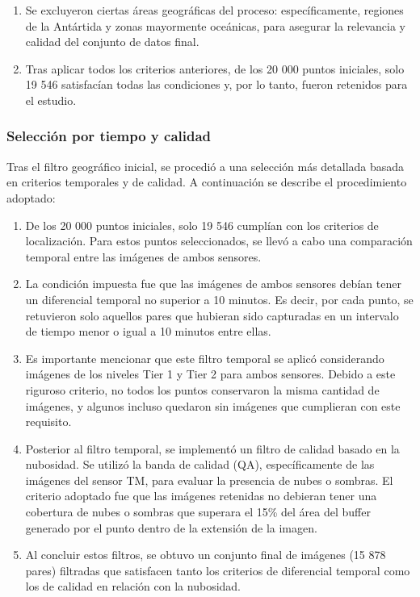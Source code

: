 \begin{enumerate}
                    \item Se excluyeron ciertas áreas geográficas del proceso: específicamente, regiones de la Antártida y zonas mayormente oceánicas, para asegurar la relevancia y calidad del conjunto de datos final.
                    
                    \item Tras aplicar todos los criterios anteriores, de los 20 000 puntos iniciales, solo 19 546 satisfacían todas las condiciones y, por lo tanto, fueron retenidos para el estudio.
                \end{enumerate}
            \subsubsection{Selección por tiempo y calidad}
                Tras el filtro geográfico inicial, se procedió a una selección más detallada basada en criterios temporales y de calidad. A continuación se describe el procedimiento adoptado:
                
                \begin{enumerate}
                    \item De los 20 000 puntos iniciales, solo 19 546 cumplían con los criterios de localización. Para estos puntos seleccionados, se llevó a cabo una comparación temporal entre las imágenes de ambos sensores.
                
                    \item La condición impuesta fue que las imágenes de ambos sensores debían tener un diferencial temporal no superior a 10 minutos. Es decir, por cada punto, se retuvieron solo aquellos pares que hubieran sido capturadas en un intervalo de tiempo menor o igual a 10 minutos entre ellas.
                    
                    \item Es importante mencionar que este filtro temporal se aplicó considerando imágenes de los niveles Tier 1 y Tier 2 para ambos sensores. Debido a este riguroso criterio, no todos los puntos conservaron la misma cantidad de imágenes, y algunos incluso quedaron sin imágenes que cumplieran con este requisito.
                    
                    \item Posterior al filtro temporal, se implementó un filtro de calidad basado en la nubosidad. Se utilizó la banda de calidad (QA), específicamente de las imágenes del sensor TM, para evaluar la presencia de nubes o sombras. El criterio adoptado fue que las imágenes retenidas no debieran tener una cobertura de nubes o sombras que superara el 15\% del área del buffer generado por el punto dentro de la extensión de la imagen.
                    
                    \item Al concluir estos filtros, se obtuvo un conjunto final de imágenes (15 878 pares) filtradas que satisfacen tanto los criterios de diferencial temporal como los de calidad en relación con la nubosidad.
                \end{enumerate}
                
